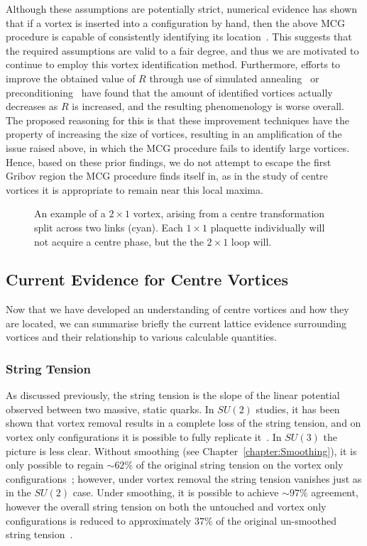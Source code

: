 Although these assumptions are potentially strict, numerical evidence has shown that if a vortex is inserted into a configuration by hand, then the above MCG procedure is capable of consistently identifying its location~\cite{Faber:1999gu,Montero:1999by}. This suggests that the required assumptions are valid to a fair degree, and thus we are motivated to continue to employ this vortex identification method. Furthermore, efforts to improve the obtained value of $R$ through use of simulated annealing~\cite{Bogolubsky:2009dc} or preconditioning~\cite{Cais:2008za} have found that the amount of identified vortices actually decreases as $R$ is increased, and the resulting phenomenology is worse overall. The proposed reasoning for this is that these improvement techniques have the property of increasing the size of vortices, resulting in an amplification of the issue raised above, in which the MCG procedure fails to identify large vortices. Hence, based on these prior findings, we do not attempt to escape the first Gribov region the MCG procedure finds itself in, as in the study of centre vortices it is appropriate to remain near this local maxima.
%
\begin{figure}[htb!]
\centering

\caption{\label{fig:MultipleLink} An example of a $2\times 1$ vortex, arising from a centre transformation split across two links (cyan). Each $1\times 1$ plaquette individually will not acquire a centre phase, but the the $2\times 1$ loop will.}
\end{figure}

\subsection{Current Evidence for Centre Vortices}\label{sec:CurrentEvidence}
Now that we have developed an understanding of centre vortices and how they are located, we can summarise briefly the current lattice evidence surrounding vortices and their relationship to various calculable quantities.
 
\subsubsection{String Tension}
As discussed previously, the string tension is the slope of the linear potential observed between two massive, static quarks. In $SU(2)$ studies, it has been shown that vortex removal results in a complete loss of the string tension, and on vortex only configurations it is possible to fully replicate it~\cite{Cais:2008za}. In $SU(3)$ the picture is less clear. Without smoothing (see Chapter~\ref{chapter:Smoothing}), it is only possible to regain $\sim 62\%$ of the original string tension on the vortex only configurations~\cite{Langfeld:2003ev}; however, under vortex removal the string tension vanishes just as in the $SU(2)$ case. Under smoothing, it is possible to achieve $\sim 97\%$ agreement, however the overall string tension on both the untouched and vortex only configurations is reduced to approximately $37\%$ of the original un-smoothed string tension~\cite{Trewartha:2015ida}.  

